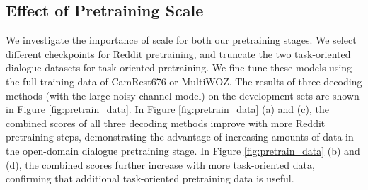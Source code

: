 \documentclass[11pt,a4paper]{article}
\begin{document}
\subsection{Effect of Pretraining Scale
\label{sec:effect_pretraining}}

We investigate the importance of scale for both our pretraining stages. We select different checkpoints for Reddit pretraining, and truncate the two task-oriented dialogue datasets for task-oriented pretraining. We fine-tune these models using the full training data of CamRest676 or MultiWOZ. The results of three decoding methods (with the large noisy channel model) on the development sets are shown in Figure \ref{fig:pretrain_data}. In Figure \ref{fig:pretrain_data} (a) and (c), the combined scores of all three decoding methods improve with more Reddit pretraining steps, demonstrating the advantage of increasing amounts of data in the open-domain dialogue pretraining stage. In Figure \ref{fig:pretrain_data} (b) and (d), the combined scores further increase with more task-oriented data, confirming that additional task-oriented pretraining data is useful. 
\end{document}
